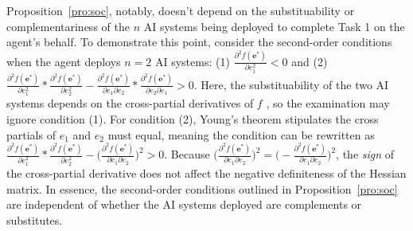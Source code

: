 Proposition~\ref{pro:soc}, notably, doesn't depend on the substituability or complementariness of the $n$ AI systems being deployed to complete Task 1 on the agent's behalf. To demonstrate this point, consider the second-order conditions when the agent deploys $n=2$ AI systems: (1) $\frac{\partial^2 f(\mathbf{e}^*)}{\partial e_1^2}<0$ and (2) $\frac{\partial^2 f(\mathbf{e}^*)}{\partial e_1^2}*\frac{\partial^2 f(\mathbf{e}^*)}{\partial e_2^2}-\frac{\partial^2 f(\mathbf{e}^*)}{\partial e_1\partial e_2}*\frac{\partial^2 f(\mathbf{e}^*)}{\partial e_2\partial e_1}>0$. Here, the substituability of the two AI systems depends on the cross-partial derivatives of $f$ \citep{RePEc:oxp:obooks:9780195102680}, so the examination may ignore condition (1). For condition (2), Young's theorem stipulates the cross partials of $e_1$ and $e_2$ must equal, meaning the condition can be rewritten as $\frac{\partial^2 f(\mathbf{e}^*)}{\partial e_1^2}*\frac{\partial^2 f(\mathbf{e}^*)}{\partial e_2^2}-\bigg(\frac{\partial^2 f(\mathbf{e}^*)}{\partial e_1\partial e_2}\bigg)^2>0$. Because $\bigg(\frac{\partial^2 f(\mathbf{e}^*)}{\partial e_1\partial e_2}\bigg)^2=\bigg(-\frac{\partial^2 f(\mathbf{e}^*)}{\partial e_1\partial e_2}\bigg)^2$, the \textit{sign} of the cross-partial derivative does not affect the negative definiteness of the Hessian matrix. In essence, the second-order conditions outlined in Proposition~\ref{pro:soc} are independent of whether the AI systems deployed are complements or substitutes.